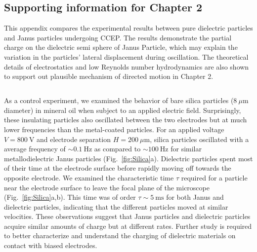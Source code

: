 \begin{appendices}



\chapter{Supporting information for Chapter 2}
This appendix compares the experimental results between pure dielectric particles and  Janus particles undergoing CCEP. The results demonstrate the partial charge on the dielectric semi sphere of Janus Particle, which may explain the variation in the particles’ lateral displacement during oscillation. The theoretical details of electrostatics and low Reynolds number hydrodynamics are also shown to support out plausible mechanism of directed motion in Chapter 2.  


\section{}


\subsection{} \label{sec:Dielectric}

As a control experiment, we examined the behavior of bare silica particles ($8~\mu\text{m}$ diameter) in mineral oil when subject to an applied electric field.
Surprisingly, these insulating particles also oscillated between the two electrodes but at much lower frequencies than the metal-coated particles.
For an applied voltage $V=800~\text{V}$ and electrode separation $H=200~\mu\text{m}$, silica particles oscillated with a average frequency of ${\sim}0.1~\text{Hz}$ as compared to ${\sim}100~\text{Hz}$ for similar metallodielectric Janus particles (Fig.~\ref{fig:Silica}a). 
Dielectric particles spent most of their time at the electrode surface before rapidly moving off towards the opposite electrode.
We examined the characteristic time $\tau$ required for a particle near the electrode surface to leave the focal plane of the microscope (Fig.~\ref{fig:Silica}a,b).
This time was of order $\tau\sim 5~\text{ms}$ for both Janus and dielectric particles, indicating that the different particles moved at similar velocities.
These observations suggest that Janus particles and dielectric particles acquire similar amounts of charge but at different rates.
Further study is required to better characterize and understand the charging of dielectric materials on contact with biased electrodes.


\end{appendices}

